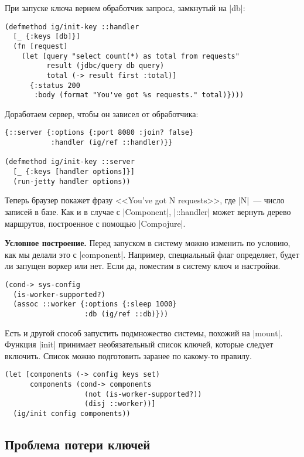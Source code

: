 При запуске ключа вернем обработчик запроса, замкнутый на \spverb|db|:

\begin{verbatim}
(defmethod ig/init-key ::handler
  [_ {:keys [db]}]
  (fn [request]
    (let [query "select count(*) as total from requests"
          result (jdbc/query db query)
          total (-> result first :total)]
      {:status 200
       :body (format "You've got %s requests." total)})))
\end{verbatim}

Доработаем сервер, чтобы он зависел от обработчика:

\begin{verbatim}
{::server {:options {:port 8080 :join? false}
           :handler (ig/ref ::handler)}}

(defmethod ig/init-key ::server
  [_ {:keys [handler options]}]
  (run-jetty handler options))
\end{verbatim}

Теперь браузер покажет фразу <<You've got N requests>>, где \spverb|N|~--- число
записей в базе. Как и в случае с \spverb|Component|, \spverb|::handler| может
вернуть дерево маршрутов, построенное с помощью \spverb|Compojure|.

\textbf{Условное построение.} Перед запуском в систему можно изменить по
условию, как мы делали это с \spverb|component|. Например, специальный флаг
определяет, будет ли запущен воркер или нет. Если да, поместим в систему ключ и
настройки.

\begin{verbatim}
(cond-> sys-config
  (is-worker-supported?)
  (assoc ::worker {:options {:sleep 1000}
                   :db (ig/ref ::db)}))
\end{verbatim}

Есть и другой способ запустить подмножество системы, похожий на
\spverb|mount|. Функция \spverb|init| принимает необязательный список ключей,
которые следует включить. Список можно подготовить заранее по какому-то правилу.

\begin{verbatim}
(let [components (-> config keys set)
      components (cond-> components
                   (not (is-worker-supported?))
                   (disj ::worker))]
  (ig/init config components))
\end{verbatim}

\subsection{Проблема потери ключей}

